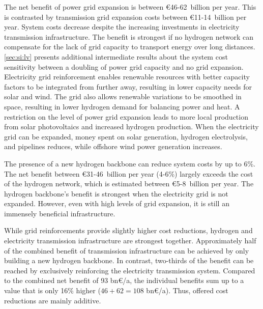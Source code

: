 The net benefit of power grid expansion is between \euro46-62~billion per year.
This is contrasted by transmission grid expansion costs between
\euro11-14~billion per year. System costs decrease despite the increasing
investments in electricity transmission infrastructure. The benefit is strongest
if no hydrogen network can compensate for the lack of grid capacity to transport
energy over long distances. \cref{sec:si:lv} presents additional intermediate
results about the system cost sensitivity between a doubling of power grid
capacity and no grid expansion. Electricity grid reinforcement enables renewable
resources with better capacity factors to be integrated from further away,
resulting in lower capacity needs for solar and wind. The grid also allows
renewable variations to be smoothed in space, resulting in lower hydrogen demand
for balancing power and heat. A restriction on the level of power grid expansion
leads to more local production from solar photovoltaics and increased hydrogen
production. When the electricity grid can be expanded, money spent on solar
generation, hydrogen electrolysis, and pipelines reduces, while offshore wind
power generation increases.



The presence of a new hydrogen backbone can reduce system costs by up to 6\%.
The net benefit between \euro31-46~billion per year (4-6\%) largely exceeds the
cost of the hydrogen network, which is estimated between \euro5-8~billion per
year. The hydrogen backbone's benefit is strongest when the electricity grid is
not expanded. However, even with high levels of grid expansion, it is still an
immensely beneficial infrastructure.


While grid reinforcements provide slightly higher cost reductions, hydrogen and
electricity transmission infrastructure are strongest together. Approximately
half of the combined benefit of transmission infrastructure can be achieved by
only building a new hydrogen backbone. In contrast, two-thirds of the benefit
can be reached by exclusively reinforcing the electricity transmission system.
Compared to the combined net benefit of 93 bn\euro/a, the individual benefits
sum up to a value that is only 16\% higher ($46+62=108$ bn\euro/a). Thus,
offered cost reductions are mainly additive.

